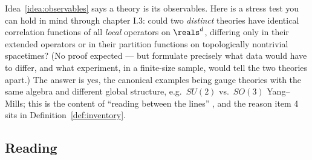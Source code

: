 \begin{exercise}[thinker]
\label{exr:two-theories-same-correlators}
Idea~\ref{idea:observables} says a theory is its observables. Here is a stress
test you can hold in mind through chapter I.3: could two \emph{distinct}
theories have identical correlation functions of all \emph{local} operators on
$\reals^d$, differing only in their extended operators or in their partition
functions on topologically nontrivial spacetimes? (No proof expected --- but
formulate precisely what data would have to differ, and what experiment, in a
finite-size sample, would tell the two theories apart.) The answer is yes, the
canonical examples being gauge theories with the same algebra and different
global structure, e.g.\ $SU(2)$ vs.\ $SO(3)$ Yang--Mills; this is the content of
``reading between the lines'' , and the reason item 4 sits in
Definition~\ref{def:inventory}.
\end{exercise}

\subsection*{Reading}

